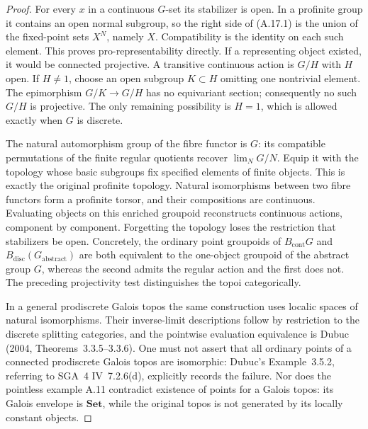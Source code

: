 \begin{proof}
For every $x$ in a continuous $G$-set its stabilizer is open. In a profinite group it contains an open normal subgroup, so the right side of (A.17.1) is the union of the fixed-point sets $X^N$, namely $X$. Compatibility is the identity on each such element. This proves pro-representability directly. If a representing object existed, it would be connected projective. A transitive continuous action is $G/H$ with $H$ open. If $H\ne1$, choose an open subgroup $K\subset H$ omitting one nontrivial element. The epimorphism $G/K\to G/H$ has no equivariant section; consequently no such $G/H$ is projective. The only remaining possibility is $H=1$, which is allowed exactly when $G$ is discrete.

The natural automorphism group of the fibre functor is $G$: its compatible permutations of the finite regular quotients recover $\lim_NG/N$. Equip it with the topology whose basic subgroups fix specified elements of finite objects. This is exactly the original profinite topology. Natural isomorphisms between two fibre functors form a profinite torsor, and their compositions are continuous. Evaluating objects on this enriched groupoid reconstructs continuous actions, component by component. Forgetting the topology loses the restriction that stabilizers be open. Concretely, the ordinary point groupoids of $B_{\mathrm{cont}}G$ and $B_{\mathrm{disc}}(G_{\mathrm{abstract}})$ are both equivalent to the one-object groupoid of the abstract group $G$, whereas the second admits the regular action and the first does not. The preceding projectivity test distinguishes the topoi categorically.

In a general prodiscrete Galois topos the same construction uses localic spaces of natural isomorphisms. Their inverse-limit descriptions follow by restriction to the discrete splitting categories, and the pointwise evaluation equivalence is Dubuc (2004, Theorems~3.3.5--3.3.6). One must not assert that all ordinary points of a connected prodiscrete Galois topos are isomorphic: Dubuc's Example~3.5.2, referring to SGA~4 IV~7.2.6(d), explicitly records the failure. Nor does the pointless example A.11 contradict existence of points for a Galois topos: its Galois envelope is $\mathbf{Set}$, while the original topos is not generated by its locally constant objects. 
\end{proof}

